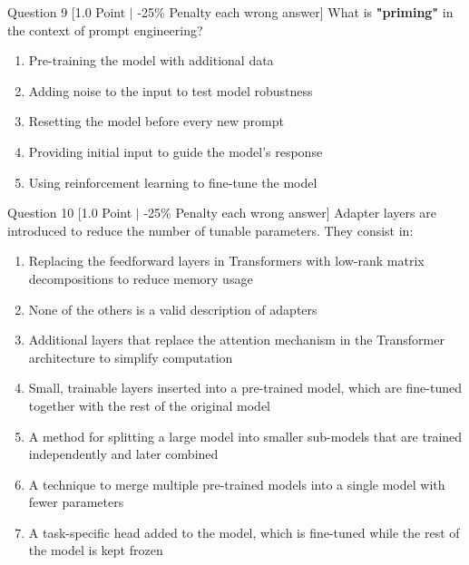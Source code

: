 \documentclass[11pt,a4paper]{article}
\begin{document}
\bigskip

\begin{questionbox}{Question 9 \hfill [1.0 Point $\vert$ -25\% Penalty each wrong answer]}
What is \textbf{"priming"} in the context of prompt engineering?
\begin{enumerate}[label=(\alph*)]
    \item Pre-training the model with additional data
    \item Adding noise to the input to test model robustness
    \item Resetting the model before every new prompt
    \item Providing initial input to guide the model's response
    \item Using reinforcement learning to fine-tune the model
\end{enumerate}
\end{questionbox}

\bigskip

\begin{questionbox}{Question 10 \hfill [1.0 Point $\vert$ -25\% Penalty each wrong answer]}
Adapter layers are introduced to reduce the number of tunable parameters. They consist in:
\begin{enumerate}[label=(\alph*)]
    \item Replacing the feedforward layers in Transformers with low-rank matrix decompositions to reduce memory usage
    \item None of the others is a valid description of adapters
    \item Additional layers that replace the attention mechanism in the Transformer architecture to simplify computation
    \item Small, trainable layers inserted into a pre-trained model, which are fine-tuned together with the rest of the original model
    \item A method for splitting a large model into smaller sub-models that are trained independently and later combined
    \item A technique to merge multiple pre-trained models into a single model with fewer parameters
    \item A task-specific head added to the model, which is fine-tuned while the rest of the model is kept frozen
\end{enumerate}
\end{questionbox}
\end{document}
